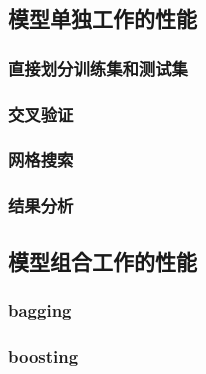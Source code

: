 \documentclass[12pt,a4paper]{article}
\theoremstyle{definition}
\begin{document}
\subsection{模型单独工作的性能}
\label{sec:pca_res_com}

\subsubsection{直接划分训练集和测试集}

\subsubsection{交叉验证}

\subsubsection{网格搜索}

\subsubsection{结果分析}

\subsection{模型组合工作的性能}

\subsubsection{bagging}

\subsubsection{boosting}
\end{document}
